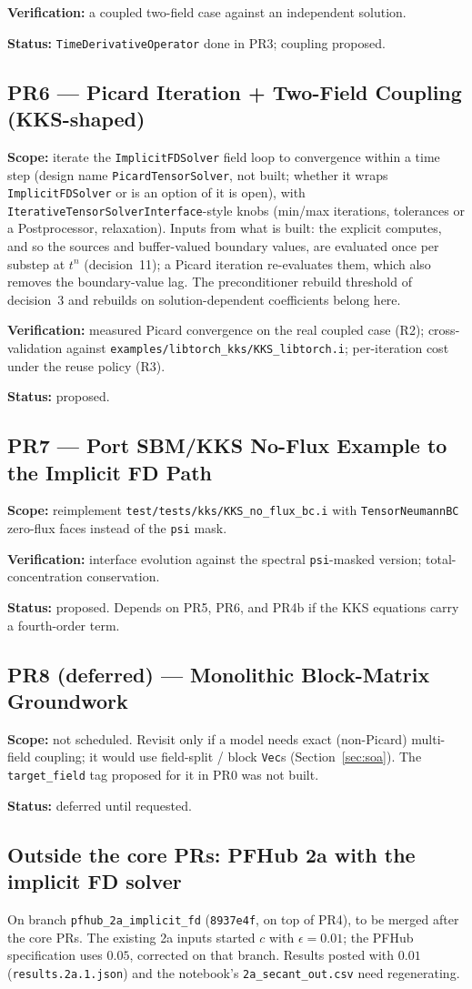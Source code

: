 \documentclass[11pt]{article}
\newcommand{\pr}[2]{\subsection{PR#1 --- #2}}
\newcommand{\status}[1]{\textcolor{marlinteal}{\textbf{Status:}} #1}
\begin{document}
\textbf{Verification:} a coupled two-field case against an independent
solution.

\status{\texttt{TimeDerivativeOperator} done in PR3; coupling proposed.}

\pr{6}{Picard Iteration + Two-Field Coupling (KKS-shaped)}
\textbf{Scope:} iterate the \texttt{ImplicitFDSolver} field loop to
convergence within a time step (design name \texttt{PicardTensorSolver},
not built; whether it wraps \texttt{ImplicitFDSolver} or is an option of it
is open), with \texttt{IterativeTensorSolverInterface}-style knobs (min/max
iterations, tolerances or a Postprocessor, relaxation). Inputs from what is
built: the explicit computes, and so the sources and buffer-valued boundary
values, are evaluated once per substep at $t^n$ (decision~11); a Picard
iteration re-evaluates them, which also removes the boundary-value lag. The
preconditioner rebuild threshold of decision~3 and rebuilds on
solution-dependent coefficients belong here.

\textbf{Verification:} measured Picard convergence on the real coupled case
(R2); cross-validation against \texttt{examples/libtorch\_kks/KKS\_libtorch.i};
per-iteration cost under the reuse policy (R3).

\status{proposed.}

\pr{7}{Port SBM/KKS No-Flux Example to the Implicit FD Path}
\textbf{Scope:} reimplement \texttt{test/tests/kks/KKS\_no\_flux\_bc.i} with
\texttt{TensorNeumannBC} zero-flux faces instead of the \texttt{psi} mask.

\textbf{Verification:} interface evolution against the spectral
\texttt{psi}-masked version; total-concentration conservation.

\status{proposed. Depends on PR5, PR6, and PR4b if the KKS equations carry a
fourth-order term.}

\pr{8 (deferred)}{Monolithic Block-Matrix Groundwork}
\textbf{Scope:} not scheduled. Revisit only if a model needs exact
(non-Picard) multi-field coupling; it would use field-split / block
\texttt{Vec}s (Section~\ref{sec:soa}). The \texttt{target\_field} tag
proposed for it in PR0 was not built.

\status{deferred until requested.}

\subsection*{Outside the core PRs: PFHub 2a with the implicit FD solver}
On branch \texttt{pfhub\_2a\_implicit\_fd} (\texttt{8937e4f}, on top of
PR4), to be merged after the core PRs. The existing 2a inputs started $c$
with $\epsilon = 0.01$; the PFHub specification uses $0.05$, corrected on
that branch. Results posted with $0.01$ (\texttt{results.2a.1.json}) and the
notebook's \texttt{2a\_secant\_out.csv} need regenerating.
\end{document}
